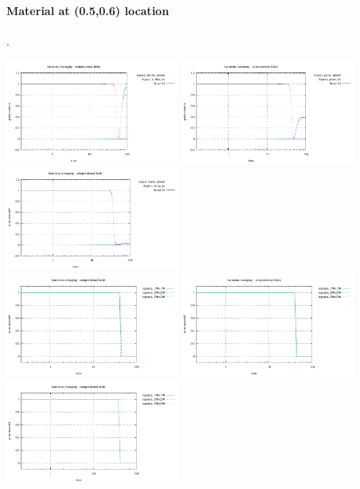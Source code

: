 \paragraph{Material at (0.5,0.6) location}.

\begin{center}
\includegraphics[width=5.7cm]{images/stokes_sphere_fs2D/point_material_arithm_comp}
\includegraphics[width=5.7cm]{images/stokes_sphere_fs2D/point_material_geom_comp}
\includegraphics[width=5.7cm]{images/stokes_sphere_fs2D/point_material_harm_comp}\\
\includegraphics[width=5.7cm]{images/stokes_sphere_fs2D/point_material_arithm_pic}
\includegraphics[width=5.7cm]{images/stokes_sphere_fs2D/point_material_geom_pic}
\includegraphics[width=5.7cm]{images/stokes_sphere_fs2D/point_material_harm_pic}
\end{center}


